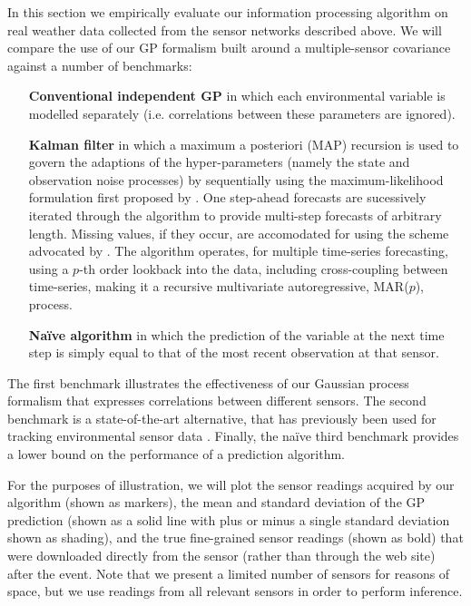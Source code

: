 \documentclass{acmtrans2m}
\begin{document}
\noindent In this section we empirically evaluate our information processing algorithm on real weather data collected from the sensor networks described above. 
We will compare the use of our GP formalism built around a multiple-sensor covariance against a number of benchmarks:
\begin{itemize}
\item[\bf Conventional independent GP\normalfont] in which each environmental variable is modelled separately (i.e. correlations between these parameters are ignored). 
\item[\bf Kalman filter\normalfont] in which a maximum a posteriori
(MAP) recursion is used to govern the adaptions of the hyper-parameters (namely the state and observation noise processes) by sequentially using the maximum-likelihood formulation first proposed by . One step-ahead forecasts are sucessively iterated through the algorithm to provide multi-step
forecasts of arbitrary length. Missing values, if they occur, are
accomodated for using the scheme advocated by 
.  The algorithm operates, for multiple time-series
forecasting, using a $p$-th order lookback into the data, including
cross-coupling between time-series, making it a recursive multivariate
autoregressive, MAR($p$), process.
\item[\bf Na\"{i}ve algorithm\normalfont] in which the prediction of the variable at the next time step is simply equal to that of the most recent observation at that sensor.
\end{itemize}
The first benchmark illustrates the effectiveness of our Gaussian process formalism that expresses correlations between different sensors. The second benchmark is a state-of-the-art alternative, that has previously been used for tracking environmental sensor data \cite{kalman_oceanography}. Finally, the na\"{i}ve third benchmark provides a lower bound on the performance of a prediction algorithm.

For the purposes of illustration, we will plot the sensor readings acquired by our algorithm (shown as markers), the mean and standard deviation of the GP prediction (shown as a solid line with plus or minus a single standard deviation shown as shading), and the true fine-grained sensor readings (shown as bold) that were downloaded directly from the sensor (rather than through the web site) after the event. Note that we present a limited number of sensors for reasons of space, but we use readings from all relevant sensors in order to perform inference. 
\end{document}
